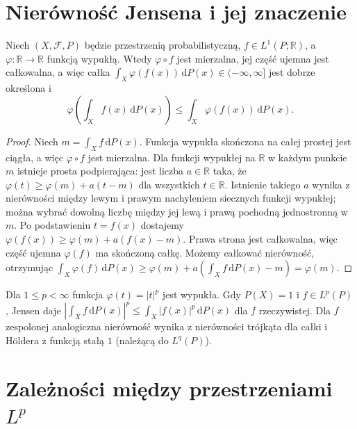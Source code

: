 \section{Nierówność Jensena i jej znaczenie}
\begin{twierdzenie}
\label{thm:jensen-14}
Niech $(X,\mathcal F,P)$ będzie przestrzenią
probabilistyczną, $f\in L^1(P;\mathbb R)$,
a $\varphi:\mathbb R\to\mathbb R$ funkcją wypukłą.
Wtedy $\varphi\circ f$ jest mierzalna, jej część ujemna
jest całkowalna, a więc całka
$\int_X\varphi(f(x))\,\mathrm dP(x)\in(-\infty,\infty]$
jest dobrze określona i
\begin{equation}\label{eq:jensen-14}
\varphi\left(\int_Xf(x)\,\mathrm dP(x)\right)
\le\int_X\varphi(f(x))\,\mathrm dP(x).
\end{equation}
\end{twierdzenie}
\begin{proof}
Niech $m=\int_Xf\,\mathrm dP(x)$.
Funkcja wypukła skończona na całej prostej jest ciągła,
a więc $\varphi\circ f$ jest mierzalna.
Dla funkcji wypukłej na $\mathbb R$ w każdym punkcie $m$
istnieje prosta podpierająca: jest liczba $a\in\mathbb R$
taka, że $\varphi(t)\ge\varphi(m)+a(t-m)$
dla wszystkich $t\in\mathbb R$.
Istnienie takiego $a$ wynika z nierówności między
lewym i prawym nachyleniem siecznych funkcji wypukłej;
można wybrać dowolną liczbę między jej lewą
i prawą pochodną jednostronną w $m$.
Po podstawieniu $t=f(x)$ dostajemy
$\varphi(f(x))\ge\varphi(m)+a(f(x)-m)$.
Prawa strona jest całkowalna, więc część ujemna
$\varphi(f)$ ma skończoną całkę. Możemy całkować
nierówność, otrzymując
$\int_X\varphi(f)\,\mathrm dP(x)
\ge\varphi(m)+a(\int_Xf\,\mathrm dP(x)-m)=\varphi(m)$.
\end{proof}

\begin{przyklad}
Dla $1\le p<\infty$ funkcja $\varphi(t)=|t|^p$
jest wypukła. Gdy $P(X)=1$ i $f\in L^p(P)$,
Jensen daje
$|\int_X f\,\mathrm dP(x)|^p\le
\int_X|f(x)|^p\,\mathrm dP(x)$ dla $f$ rzeczywistej.
Dla $f$ zespolonej analogiczna nierówność wynika
z nierówności trójkąta dla całki i Höldera
z funkcją stałą $1$ (należącą do $L^q(P)$).
\end{przyklad}

\section{Zależności między przestrzeniami $L^p$}

